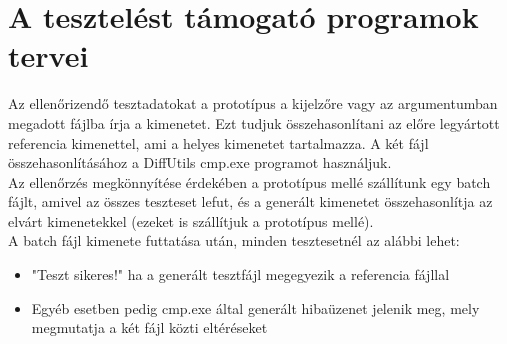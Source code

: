 \section{A tesztelést támogató programok tervei}

Az ellenőrizendő tesztadatokat a prototípus a kijelzőre vagy az argumentumban megadott fájlba írja a kimenetet. Ezt tudjuk összehasonlítani az előre legyártott referencia kimenettel, ami a helyes kimenetet tartalmazza. A két fájl összehasonlításához a DiffUtils cmp.exe programot használjuk.\\

Az ellenőrzés megkönnyítése érdekében a prototípus mellé szállítunk egy batch fájlt, amivel az összes teszteset lefut, és a generált kimenetet összehasonlítja az elvárt kimenetekkel (ezeket is szállítjuk a prototípus mellé).\\

A batch fájl kimenete futtatása után, minden tesztesetnél az alábbi lehet:
\begin{itemize}
\item "Teszt sikeres!" ha a generált tesztfájl megegyezik a referencia fájllal
\item Egyéb esetben pedig cmp.exe által generált hibaüzenet jelenik meg, mely megmutatja a két fájl közti eltéréseket
\end{itemize}
